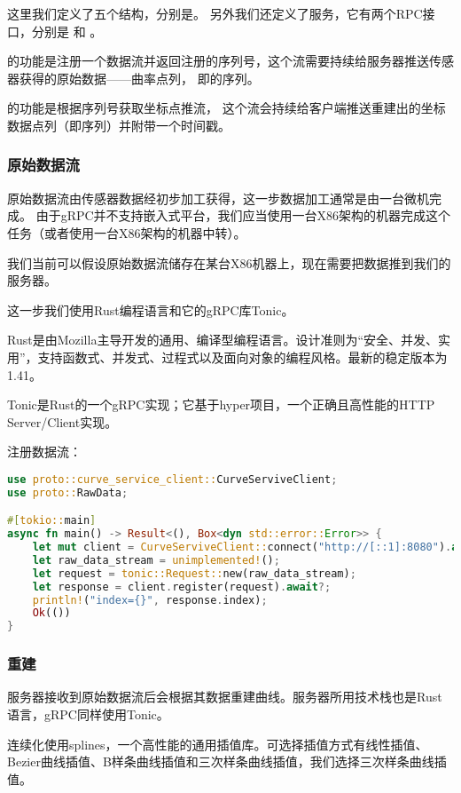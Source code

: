 这里我们定义了五个结构，分别是。
另外我们还定义了服务，它有两个RPC接口，分别是 和 。

的功能是注册一个数据流并返回注册的序列号，这个流需要持续给服务器推送传感器获得的原始数据——曲率点列，
即的序列。

的功能是根据序列号获取坐标点推流，
这个流会持续给客户端推送重建出的坐标数据点列（即序列）并附带一个时间戳。

\subsubsection{原始数据流}

原始数据流由传感器数据经初步加工获得，这一步数据加工通常是由一台微机完成。
由于gRPC并不支持嵌入式平台，我们应当使用一台X86架构的机器完成这个任务（或者使用一台X86架构的机器中转）。

我们当前可以假设原始数据流储存在某台X86机器上，现在需要把数据推到我们的服务器。

这一步我们使用Rust编程语言和它的gRPC库Tonic。

Rust是由Mozilla主导开发的通用、编译型编程语言。设计准则为“安全、并发、实用”，支持函数式、并发式、过程式以及面向对象的编程风格。最新的稳定版本为1.41。

Tonic是Rust的一个gRPC实现；它基于hyper项目，一个正确且高性能的HTTP Server/Client实现。

注册数据流：

\begin{lstlisting}[language=Rust, style=boxed]
use proto::curve_service_client::CurveServiveClient;
use proto::RawData;

#[tokio::main]
async fn main() -> Result<(), Box<dyn std::error::Error>> {
    let mut client = CurveServiveClient::connect("http://[::1]:8080").await?;
  	let raw_data_stream = unimplemented!();
    let request = tonic::Request::new(raw_data_stream);
    let response = client.register(request).await?;
    println!("index={}", response.index);
    Ok(())
}
\end{lstlisting}
\subsubsection{重建}

服务器接收到原始数据流后会根据其数据重建曲线。服务器所用技术栈也是Rust语言，gRPC同样使用Tonic。

连续化使用splines，一个高性能的通用插值库。可选择插值方式有线性插值、Bezier曲线插值、B样条曲线插值和三次样条曲线插值，我们选择三次样条曲线插值。


